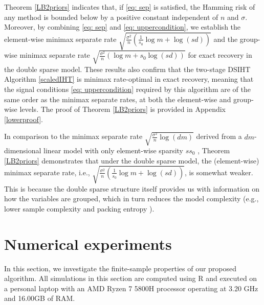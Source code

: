 \documentclass[12pt]{article}
\begin{document}
Theorem \ref{LB2priors} indicates that, if \eqref{eq: sep} is satisfied, the Hamming risk of any method is bounded below by a positive constant independent of $ n$ and $\sigma$. 
Moreover, by combining \eqref{eq: sep} and \eqref{eq: uppercondition}, we establish the element-wise minimax separate rate $\sqrt{\frac{\sigma^2}n \left( \frac1{s_0} \log m +  \log(sd) \right)}$
and the group-wise minimax separate rate $\sqrt{\frac{\sigma^2}n \left( \log m + s_0 \log(sd) \right)}$ for exact recovery in the double sparse model.
These results also confirm that the two-stage DSIHT Algorithm \ref{scaledIHT} is minimax rate-optimal in exact recovery, meaning that the signal conditions \eqref{eq: uppercondition} required by this algorithm are of the same order as the minimax separate rates, at both the element-wise and group-wise levels.
The proof of Theorem \ref{LB2priors} is provided in Appendix \ref{lowerproof}.

In comparison to the minimax separate rate $\sqrt{\frac{\sigma^2}n  \log(dm) }$ derived from a $dm$-dimensional linear model with only element-wise sparsity $ss_0$ \cite{CM18}, Theorem \ref{LB2priors} demonstrates that under the double sparse model, the (element-wise) minimax separate rate, i.e., $\sqrt{\frac{\sigma^2}n \left( \frac1{s_0} \log m +  \log(sd) \right)}$, is somewhat weaker.
This is because the double sparse structure itself provides us with information on how the variables are grouped, which in turn reduces the model complexity (e.g., lower sample complexity \cite{CZ22} and packing entropy \cite{LZ22}).



\section{Numerical experiments}\label{sec:num}
In this section, we investigate the finite-sample properties of our proposed algorithm. All simulations in this section are computed using R and executed on a personal laptop with an AMD Ryzen 7 5800H processor operating at 3.20 GHz and 16.00GB of RAM.
\end{document}
